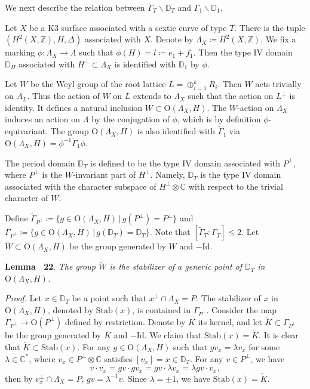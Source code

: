 \documentclass[
]{article}
\begin{document}
We next describe the relation between \(\Gamma_T\backslash\mathbb{D}_T\)
and \(\Gamma_1\backslash\mathbb{D}_1\).

Let \(X\) be a K3 surface associated with a sextic curve of type \(T\).
There is the tuple \((H^2(X,\mathbb{Z}),H,\Delta)\) associated with
\(X\). Denote by \(\Lambda_X\coloneqq H^2(X,\mathbb{Z})\). We fix a
marking \(\phi\colon \Lambda_X\to\Lambda\) such that
\(\phi(H)=l\coloneqq e_1+f_1\). Then the type IV domain \(\mathbb{D}_H\)
associated with \(H^\perp\subset \Lambda_X\) is identified with
\(\mathbb{D}_1\) by \(\phi\).

Let \(W\) be the Weyl group of the root lattice
\(L=\oplus_{i=1}^k R_i\). Then \(W\) acts trivially on \(A_L\). Thus the
action of \(W\) on \(L\) extends to \(\Lambda_X\) such that the action
on \(L^\perp\) is identity. It defines a natural inclusion
\(W\subset\mathrm{O}(\Lambda_X,H)\). The \(W\)-action on \(\Lambda_X\)
induces an action on \(\Lambda\) by the conjugation of \(\phi\), which
is by definition \(\phi\)-equivariant. The group
\(\mathrm{O}(\Lambda_X,H)\) is also identified with
\(\widetilde\Gamma_1\) via
\(\mathrm{O}(\Lambda_X,H) = \phi^{-1}\widetilde\Gamma_1\phi\).

The period domain \(\mathbb{D}_T\) is defined to be the type IV domain
associated with \(P^\perp\), where \(P^\perp\) is the \(W\)-invariant
part of \(H^{\perp}\). Namely, \(\mathbb{D}_T\) is the type IV domain
associated with the character subspace of \(H^\perp\otimes\mathbb{C}\)
with respect to the trivial character of \(W\).

Define
\(\widetilde\Gamma_{P^\perp}\coloneqq\{ g\in\mathrm{O}(\Lambda_X,H) \,\big|\, g(P^\perp)=P^\perp \}\)
and
\(\Gamma_{P^\perp}\coloneqq\{ g\in\mathrm{O}(\Lambda_X,H) \,\big|\, g(\mathbb{D}_T)=\mathbb{D}_T \}\).
Note that \([\widetilde{\Gamma}_T:\Gamma_T]\le 2\). Let
\(\widetilde{W}\subset\mathrm{O}(\Lambda_X,H)\) be the group generated
by \(W\) and \(-\mathrm{Id}\).

\textbf{Lemma~ 22}. \emph{\label{lem: Stab(x) = W} The group
\(\widetilde{W}\) is the stabilizer of a generic point of
\(\mathbb{D}_T\) in \(\mathrm{O}(\Lambda_X,H)\).}

\emph{Proof.} Let \(x\in\mathbb{D}_T\) be a point such that
\(x^\perp\cap\Lambda_X=P\). The stabilizer of \(x\) in
\(\mathrm{O}(\Lambda_X,H)\), denoted by \(\mathrm{Stab}(x)\), is
contained in \(\Gamma_{P^\perp}\). Consider the map
\(\Gamma_{P^\perp}\to\mathrm{O}(P^\perp)\) defined by restriction.
Denote by \(K\) its kernel, and let
\(\widetilde{K}\subset\Gamma_{P^\perp}\) be the group generated by \(K\)
and \(-\mathrm{Id}\). We claim that \(\mathrm{Stab}(x)=\widetilde{K}\).
It is clear that \(\widetilde{K}\subset\mathrm{Stab}(x)\). For any
\(g\in\mathrm{O}(\Lambda_X,H)\) such that \(g v_x=\lambda v_x\) for some
\(\lambda\in\mathbb{C}^*\), where \(v_x\in P^\perp\otimes\mathbb{C}\)
satisfies \([v_x]=x\in\mathbb{D}_T\). For any \(v\in P^\perp\), we have
\[v\cdot v_x = g v\cdot g v_x = g v\cdot \lambda v_x = \lambda g v\cdot v_x,\]
then by \(v_x^\perp\cap\Lambda_X=P\), \(g v=\lambda^{-1}v\). Since
\(\lambda=\pm1\), we have \(\mathrm{Stab}(x)=\widetilde{K}\).
\end{document}

